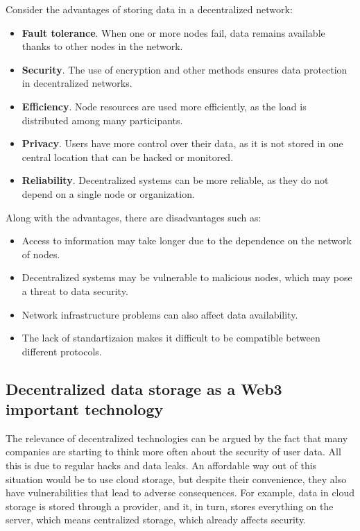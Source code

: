 \documentclass[10pt,conference,a4paper]{IEEEtran_EDM}
\begin{document}
Consider the advantages of storing data in a decentralized network:
\begin{itemize}
    \item \textbf{Fault tolerance}. When one or more nodes fail, data remains available thanks to other nodes in the network.
    \item \textbf{Security}. The use of encryption and other methods ensures data protection in decentralized networks.
    \item \textbf{Efficiency}. Node resources are used more efficiently, as the load is distributed among many participants.
    \item \textbf{Privacy}. Users have more control over their data, as it is not stored in one central location that can be hacked or monitored.
    \item \textbf{Reliability}. Decentralized systems can be more reliable, as they do not depend on a single node or organization.
\end{itemize}
Along with the advantages, there are disadvantages such as:
\begin{itemize}
    \item Access to information may take longer due to the dependence on the network of nodes.
    \item Decentralized systems may be vulnerable to malicious nodes, which may pose a threat to data security.
    \item Network infrastructure problems can also affect data availability.
    \item The lack of standartizaion makes it difficult to be compatible between different protocols.
\end{itemize}

\subsection{Decentralized data storage as a Web3 important technology }

The relevance of decentralized technologies can be argued by the fact that many companies are starting to think more often about the security of user data.
All this is due to regular hacks and data leaks.
An affordable way out of this situation would be to use cloud storage, but despite their convenience, they also have vulnerabilities that lead to adverse consequences.
For example, data in cloud storage is stored through a provider, and it, in turn, stores everything on the server, which means centralized storage, which already affects security.
\end{document}
